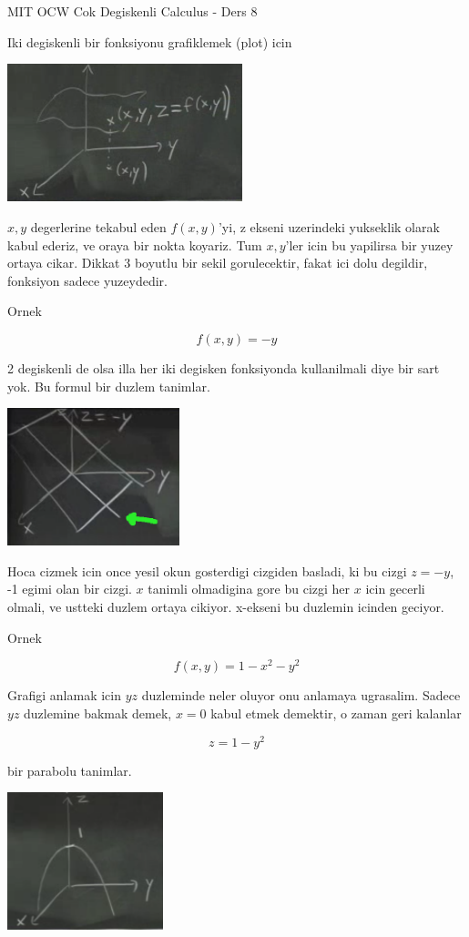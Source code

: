 \documentclass[12pt,fleqn]{article}
\begin{document}
MIT OCW Cok Degiskenli Calculus - Ders 8

Iki degiskenli bir fonksiyonu grafiklemek (plot) icin 

\includegraphics[height=4cm]{8_1.png}

$x,y$ degerlerine tekabul eden $f(x,y)$'yi, z ekseni uzerindeki yukseklik
olarak kabul ederiz, ve oraya bir nokta koyariz. Tum $x,y$'ler icin bu
yapilirsa bir yuzey ortaya cikar. Dikkat 3 boyutlu bir sekil gorulecektir,
fakat ici dolu degildir, fonksiyon sadece yuzeydedir. 

Ornek

\[ f(x,y) = -y \]

2 degiskenli de olsa illa her iki degisken fonksiyonda kullanilmali diye
bir sart yok. Bu formul bir duzlem tanimlar. 

\includegraphics[height=4cm]{8_2.png}

Hoca cizmek icin once yesil okun gosterdigi cizgiden basladi, ki bu cizgi
$z=-y$, -1 egimi olan bir cizgi. $x$ tanimli olmadigina gore bu cizgi her
$x$ icin gecerli olmali, ve ustteki duzlem ortaya cikiyor. x-ekseni bu
duzlemin icinden geciyor. 

Ornek 

\[ f(x,y) = 1-x^2-y^2 \]

Grafigi anlamak icin $yz$ duzleminde neler oluyor onu anlamaya
ugrasalim. Sadece $yz$ duzlemine bakmak demek, $x=0$ kabul etmek demektir,
o zaman geri kalanlar 

\[ z = 1-y^2 \]

bir parabolu tanimlar. 

\includegraphics[height=4cm]{8_3.png}
\end{document}
